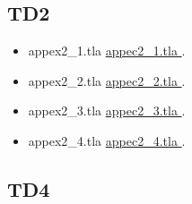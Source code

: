 \documentclass[ 12pt]{article}
\begin{document}
  
\subsection{TD2}
    
 \begin{itemize}
  \item[]   appex2\_1.tla 
    \href{http://mery54.github.io/teaching/mvsi/models/appex2_1.tla}{
      appec2\_1.tla }.
      \item[]   appex2\_2.tla 
    \href{http://mery54.github.io/teaching/mvsi/models/appex2_2.tla}{
      appec2\_2.tla }.
       \item[]   appex2\_3.tla 
    \href{http://mery54.github.io/teaching/mvsi/models/appex2_3.tla}{
      appec2\_3.tla }.
          \item[]   appex2\_4.tla 
    \href{http://mery54.github.io/teaching/mvsi/models/appex2_4.tla}{
      appec2\_4.tla }.
  \end{itemize}


  
\subsection{TD4}
    
\end{document}
